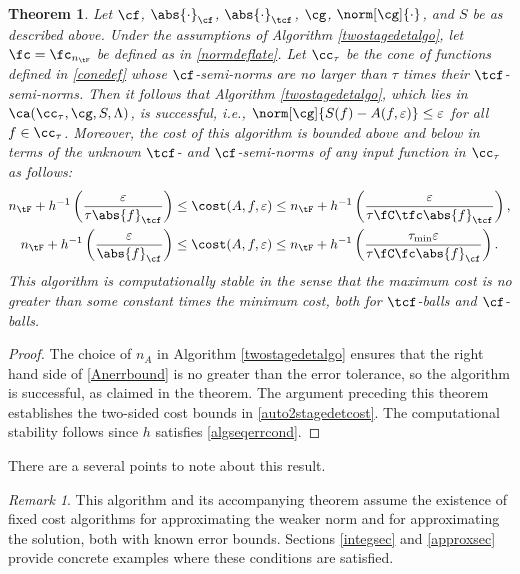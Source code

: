 \documentclass[]{elsarticle}
\newtheorem{theorem}{Theorem}
\theoremstyle{definition}
\theoremstyle{remark}
\newtheorem{rem}{Remark}
\newcommand{\Fnorm}[1]{\abs{#1}_{\cf}}
\newcommand{\Ftnorm}[1]{\abs{#1}_{\tcf}}
\newcommand{\Gnorm}[1]{\norm[\cg]{#1}}
\begin{document}
\begin{theorem}  \label{TwoStageDetermThm}  Let $\cf$, $\Fnorm{\cdot}$, $\Ftnorm{\cdot}$, $\cg$, $\Gnorm{\cdot}$, and $S$ be as described above.  Under the assumptions of Algorithm  \ref{twostagedetalgo}, let $\fc=\fc_{n_{\tF}}$ be defined as in \eqref{normdeflate}.
Let $\cc_\tau$ be the cone of functions defined in \eqref{conedef} whose $\cf$-semi-norms are no larger than $\tau$ times their $\tcf$-semi-norms.  Then it follows that Algorithm \ref{twostagedetalgo}, which lies in $\ca(\cc_{\tau},\cg,S,\Lambda)$, is successful,  i.e.,  $\norm[\cg]{S(f)-A(f,\varepsilon)} \le \varepsilon$ for all $f \in \cc_\tau$.  Moreover, the cost of this algorithm is bounded above and below in terms of the unknown $\tcf$- and $\cf$-semi-norms of any input function in $\cc_{\tau}$ as follows:
\begin{subequations}  \label{auto2stagedetcost}
\begin{gather}
n_{\tF}+ h^{-1}\left(\frac{\varepsilon}{\tau \Ftnorm{f}} \right) \le 
\cost(A,f,\varepsilon)
\le n_{\tF}+ h^{-1}\left(\frac{\varepsilon}{\tau \fC\tfc\Ftnorm{f}}\right), \\
n_{\tF}+ h^{-1}\left(\frac{\varepsilon}{\Fnorm{f}} \right) \le \cost(A,f,\varepsilon)
\le n_{\tF}+h^{-1}\left(\frac{\tau_{\min}\varepsilon}{\tau \fC\fc\Fnorm{f}}\right).
\end{gather}
\end{subequations}
This algorithm is computationally stable in the sense that the maximum cost is no greater than some constant times the minimum cost, both for $\tcf$-balls and $\cf$-balls.
\end{theorem}

\begin{proof} The choice of $n_A$ in Algorithm \ref{twostagedetalgo} ensures that the right hand side of \eqref{Anerrbound} is no greater than the error tolerance, so the algorithm is successful, as claimed in the theorem.  The argument preceding this theorem establishes the two-sided cost bounds in \eqref{auto2stagedetcost}. The computational stability follows since $h$ satisfies \eqref{algseqerrcond}.
\end{proof}

There are a several points to note about this result.

\begin{rem} This algorithm and its accompanying theorem assume the existence of fixed cost algorithms for approximating the weaker norm and for approximating the solution, both with known error bounds. Sections \ref{integsec} and \ref{approxsec} provide concrete examples where these conditions are satisfied.
\end{rem}
\end{document}
